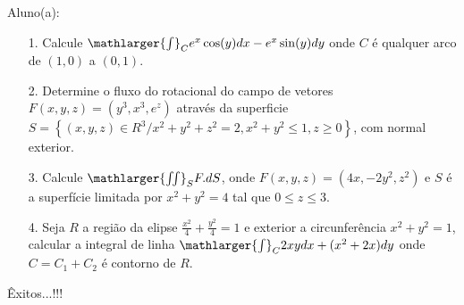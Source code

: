 \documentclass[oneside,a4paper,12pt]{article}
\begin{document}
     \begin{flushleft}
     	Aluno(a):
     \end{flushleft}
 
 \begin{itemize}
 	\item[1.] Calcule $\mathlarger{\int}_{C}e^{x}\cos(y)dx-e^{x}\sin(y)dy$ onde $C$ é qualquer arco de $(1,0)$ a $(0,1)$.
 \end{itemize}
 \begin{itemize}
 	\item[2.] Determine o fluxo do rotacional do campo de vetores $F(x,y,z)=(y^{3},x^{3},e^{z})$ através da superficie $S=\left\lbrace (x,y,z)\in R^{3} / x^{2}+y^{2}+z^{2}=2, x^{2}+y^{2}\leq 1, z\geq 0 \right\rbrace $, com normal exterior. 
 \end{itemize}
 \begin{itemize}
 	\item [3.] Calcule $\mathlarger{\iint}_{S}F.dS$, onde $F(x,y,z)=(4x,-2y^{2},z^{2})$ e $S$ é a superfície limitada por $x^{2}+y^{2}=4$ tal que $0\leq z \leq3$.
 \end{itemize}
 \begin{itemize}
 	\item[4.] Seja $R$ a região da elipse $\frac{x^{2}}{4}+\frac{y^{2}}{4}=1$ e exterior a circunferência $x^{2}+y^{2}=1$, calcular a integral de linha $\mathlarger{\int}_{C}2xydx+(x^{2}+2x)dy$ onde $C=C_{1}+C_{2}$ é contorno de $R$.
 \end{itemize}
\flushbottom
\flushright
Êxitos...!!!
\end{document}

